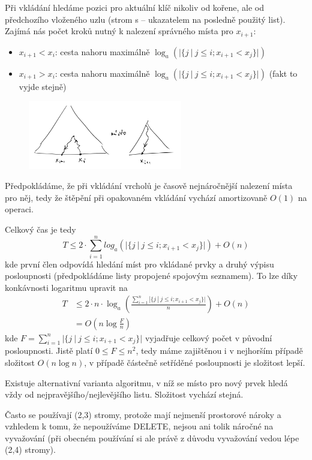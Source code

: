 \documentclass[11pt]{report} %
\numberwithin{equation}{section}
\begin{document}
Při vkládání hledáme pozici pro aktuální klíč nikoliv od kořene, ale od předchozího vloženého uzlu (strom s  -- ukazatelem na posledně použitý list). Zajímá nás počet kroků nutný k nalezení správného místa pro $x_{i+1}$:
\begin{itemize}
\item $x_{i+1} < x_i$: cesta nahoru maximálně $\log_a(|\{j\ |\ j\leq i; x_{i+1} < x_{j} \}|)$
\item $x_{i+1} > x_i$: cesta nahoru maximálně $\log_a(|\{j\ |\ j\leq i; x_{i+1} < x_{j} \}|)$ (fakt to vyjde stejně)
\end{itemize}

\begin{figure}[H]
	\centering\includegraphics[width=0.6\textwidth]{img/asort.png}
\end{figure}


Předpokládáme, že při vkládání vrcholů je časově nejnáročnější nalezení místa pro něj, tedy že štěpění při opakovaném vkládání vychází amortizovaně $O(1)$ na operaci.

Celkový čas je tedy
$$T \leq 2\cdot \sum\limits_{i=1}^{n} log_a(|\{j\ |\ j\leq i; x_{i+1} < x_{j} \}|) + O(n)$$
kde první člen odpovídá hledání míst pro vkládané prvky a druhý výpisu posloupnosti (předpokládáme listy propojené spojovým seznamem). To lze díky konkávnosti logaritmu upravit na
\begin{align*}
T &\leq 2\cdot n\cdot \log_a\left(\frac{\sum\limits_{i=1}^{n} |\{j\ |\ j\leq i; x_{i+1} < x_{j} \}|}{n}\right) + O(n)\\
&= O(n\log\frac{F}{n})
\end{align*}
kde $F = \sum\limits_{i=1}^{n} |\{j\ |\ j\leq i; x_{i+1} < x_{j} \}|$ vyjadřuje celkový počet  v původní posloupnosti. Jistě platí $0 \leq F \leq n^2$, tedy máme zajištěnou i v nejhorším případě složitost $O(n\log n)$, v případě částečně setříděné posloupnosti je složitost lepší.

Existuje alternativní varianta algoritmu, v níž se místo pro nový prvek hledá vždy od nejpravějšího/nejlevějšího listu. Složitost vychází stejná.

Často se používají (2,3) stromy, protože mají nejmenší prostorové nároky a vzhledem k tomu, že nepoužíváme DELETE, nejsou ani tolik náročné na vyvažování (při obecném používání si ale právě z důvodu vyvažování vedou lépe (2,4) stromy).
\end{document}
